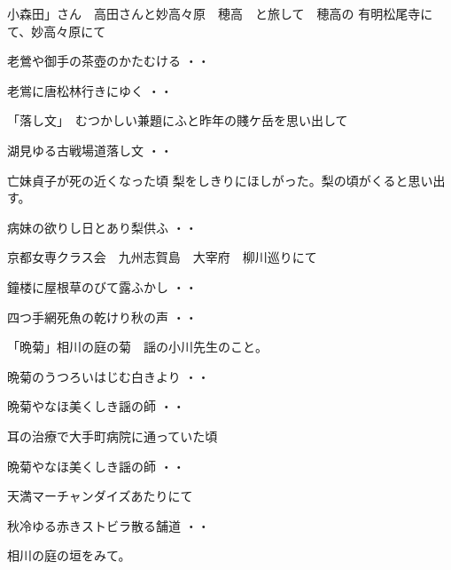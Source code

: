 \vspace{0.6cm}
小森田」さん　高田さんと妙高々原　穂高　と旅して　穂高の
有明松尾寺にて、妙高々原にて
\begin{shiika}老鶯や御手の茶壺のかたむける
\hfill{・・}\end{shiika}
\begin{shiika}老鴬に唐松林行きにゆく
\hfill{・・}\end{shiika}
「落し文」　むつかしい兼題にふと昨年の賤ケ岳を思い出して
\begin{shiika}湖見ゆる古戦場道落し文
\hfill{・・}\end{shiika}
\vspace{0.6cm}
亡妹貞子が死の近くなった頃
梨をしきりにほしがった。梨の頃がくると思い出す。
\begin{shiika}病妹の欲りし日とあり梨供ふ
\hfill{・・}\end{shiika}
\vspace{0.6cm}
京都女専クラス会　九州志賀島　大宰府　柳川巡りにて
\begin{shiika}鐘楼に屋根草のびて露ふかし
\hfill{・・}\end{shiika}
\begin{shiika}四つ手網死魚の乾けり秋の声
\hfill{・・}\end{shiika}
\vspace{0.6cm}
「晩菊」相川の庭の菊　謡の小川先生のこと。
\begin{shiika}晩菊のうつろいはじむ白きより
\hfill{・・}\end{shiika}
\begin{shiika}晩菊やなほ美くしき謡の師
\hfill{・・}\end{shiika}
\vspace{0.6cm}
耳の治療で大手町病院に通っていた頃
\begin{shiika}晩菊やなほ美くしき謡の師
\hfill{・・}\end{shiika}
\vspace{0.6cm}
天満マーチャンダイズあたりにて
\begin{shiika}秋冷ゆる赤きストビラ散る舗道
\hfill{・・}\end{shiika}
\vspace{0.6cm}
相川の庭の垣をみて。
